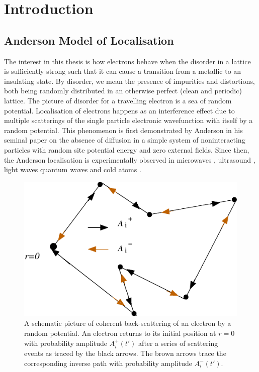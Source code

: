 	
\chapter{Introduction}
\label{chap-INTRO}

\section{Anderson Model of Localisation}
\label{sec-AML}

  The interest in this thesis is how electrons behave when the disorder in a lattice is sufficiently strong such that it can cause a transition from a metallic to an insulating state.  By disorder, we mean the presence of impurities and distortions, both being randomly distributed in an otherwise perfect (clean and periodic) lattice.  The picture of disorder for a travelling electron is a sea of random potential.  Localisation of electrons happens as an interference effect due to multiple scatterings of the single particle electronic wavefunction with itself by a random potential.  This phenomenon is first demonstrated by Anderson \cite{And58} in his seminal paper on the absence of diffusion in a simple system of noninteracting particles with random site potential energy and zero external fields.
Since then, the Anderson localisation \cite{KraM93,EveM08} is experimentally observed in microwaves \cite{DalASPM91}, ultrasound \cite{HuSPS08,FaeSPLT09}, light waves \cite{WieBLR97,MooPYB08} quantum waves \cite{HasSMI08,RicRMZ10} and cold atoms \cite{RoaDFF08,BilJZB08}.
%
\begin{figure}
  \centering
  \includegraphics[width=4.5in]{localisation.eps}
   \caption[ A schematic picture of coherent back-scattering of an electron by a random potential.]{  A schematic picture of coherent back-scattering of an electron by a random potential.  An electron returns to its initial position at $r=0$  with probability amplitude $A_i^+(t')$ after a series of scattering events as traced by the black arrows.  The brown arrows trace the corresponding inverse path with probability amplitude $A_i^-(t')$.}
\label{fig-localisation}
\end{figure}
%

